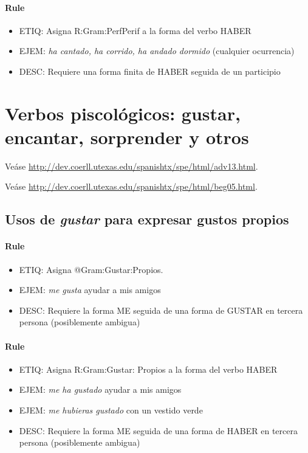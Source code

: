 \documentclass[11pt]{report}
\begin{document}
\paragraph*{Rule}
\begin{itemize}
\item ETIQ: Asigna R:Gram:PerfPerif a la forma del verbo HABER
\item EJEM: \emph{ha cantado, ha corrido, ha andado dormido} (cualquier ocurrencia)
\item DESC: Requiere una forma finita de HABER seguida de un participio
\end{itemize}

\section{Verbos piscológicos: gustar, encantar, sorprender y otros}
Veáse \url{http://dev.coerll.utexas.edu/spanishtx/spe/html/adv13.html}.

Veáse \url{http://dev.coerll.utexas.edu/spanishtx/spe/html/beg05.html}.

\subsection{Usos de \emph{gustar} para expresar gustos propios}
\paragraph*{Rule}
\begin{itemize}
\item ETIQ: Asigna @Gram:Gustar:Propios.
\item EJEM: \emph{me gusta} ayudar a mis amigos 
\item DESC: Requiere la forma ME seguida de una forma de GUSTAR en tercera persona (posiblemente ambigua)
\end{itemize}

\paragraph*{Rule}
\begin{itemize}
\item ETIQ: Asigna R:Gram:Gustar: Propios a la forma del verbo HABER
\item EJEM: \emph{me ha gustado} ayudar a mis amigos 
\item EJEM: \emph{me hubieras gustado} con un vestido verde 
\item DESC: Requiere la forma ME seguida de una forma de HABER en tercera persona (posiblemente ambigua)
\end{itemize}
\end{document}
